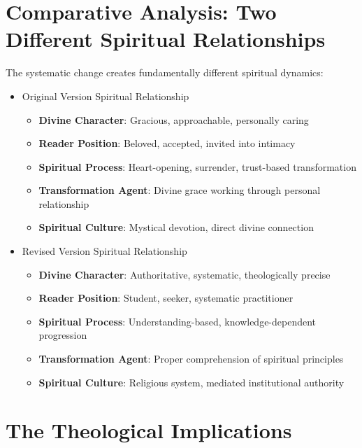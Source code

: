 \documentclass[11pt,twoside]{book}
\begin{document}
\section*{Comparative Analysis: Two Different Spiritual Relationships}
\label{sec:orga75a72e}

The systematic change creates fundamentally different spiritual dynamics:
\begin{itemize}
\item Original Version Spiritual Relationship
\label{sec:org1b3e6be}
\begin{itemize}
\item \textbf{\textbf{Divine Character}}: Gracious, approachable, personally caring
\item \textbf{\textbf{Reader Position}}: Beloved, accepted, invited into intimacy
\item \textbf{\textbf{Spiritual Process}}: Heart-opening, surrender, trust-based transformation
\item \textbf{\textbf{Transformation Agent}}: Divine grace working through personal relationship
\item \textbf{\textbf{Spiritual Culture}}: Mystical devotion, direct divine connection
\end{itemize}
\item Revised Version Spiritual Relationship
\label{sec:orgc96d165}
\begin{itemize}
\item \textbf{\textbf{Divine Character}}: Authoritative, systematic, theologically precise
\item \textbf{\textbf{Reader Position}}: Student, seeker, systematic practitioner
\item \textbf{\textbf{Spiritual Process}}: Understanding-based, knowledge-dependent progression
\item \textbf{\textbf{Transformation Agent}}: Proper comprehension of spiritual principles
\item \textbf{\textbf{Spiritual Culture}}: Religious system, mediated institutional authority
\end{itemize}
\end{itemize}
\section*{The Theological Implications}
\label{sec:org893f625}
\end{document}
